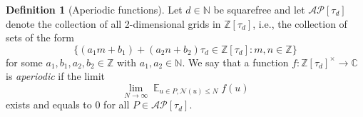 \documentclass[11pt]{amsart}
\theoremstyle{definition}
\newtheorem{definition}[lemma]{Definition}
\DeclareMathOperator*{\E}{\mathbb{E}}
\newcommand{\C}{{\mathbb C}}
\newcommand{\D}{{\mathbb D}}
\newcommand{\N}{{\mathbb N}}
\newcommand{\NN}{{\mathcal N}}
\newcommand{\R}{{\mathbb R}}
\newcommand{\Z}{{\mathbb Z}}
\begin{document}
\begin{definition}[Aperiodic functions]\label{aperiodicdef}
   Let $d\in\N$ be squarefree and let $\mathcal{AP}[\tau_{d}]$ denote the collection  of all  2-dimensional grids in $\Z[\tau_{d}]$, i.e., the collection of sets of the form
   \begin{equation}\label{eq:adcd} 
\{(a_{1}m+b_{1})+(a_{2}n+b_{2})\tau_{d}\in \Z[\tau_{d}]\colon m,n\in\Z\}
\end{equation}
        for some $a_{1},b_{1},a_{2},b_{2}\in\Z$ with $a_{1},a_{2}\in\N$.
   We say that a function $f\colon\Z[\tau_{d}]^{\times}\to\C$ is \emph{aperiodic} if the limit
\begin{equation}\label{eq: aperiodicdef}
\lim_{N\to\infty}\E_{u\in P,\NN(u) \leq N}f(u)
\end{equation}
exists and equals to 0 for all $P\in\mathcal{AP}[\tau_{d}]$. 
\end{definition}
\end{document}
